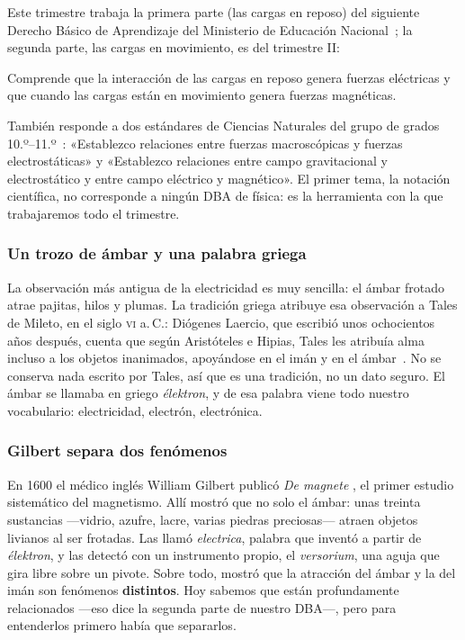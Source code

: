 \documentclass[11pt]{article}
\begin{document}
Este trimestre trabaja la primera parte (las cargas en reposo) del siguiente
Derecho Básico de Aprendizaje del Ministerio de Educación
Nacional~\cite{mendba}; la segunda parte, las cargas en movimiento, es del
trimestre II:

\begin{dba}
Comprende que la interacción de las cargas en reposo genera fuerzas eléctricas
y que cuando las cargas están en movimiento genera fuerzas magnéticas.
\end{dba}

También responde a dos estándares de Ciencias Naturales del grupo de grados
10.º--11.º~\cite{menestandares}: «Establezco relaciones entre fuerzas
macroscópicas y fuerzas electrostáticas» y «Establezco relaciones entre campo
gravitacional y electrostático y entre campo eléctrico y magnético». El primer
tema, la notación científica, no corresponde a ningún DBA de física: es la
herramienta con la que trabajaremos todo el trimestre.


\subsubsection*{Un trozo de ámbar y una palabra griega}

La observación más antigua de la electricidad es muy sencilla: el ámbar
frotado atrae pajitas, hilos y plumas. La tradición griega atribuye esa
observación a Tales de Mileto, en el siglo \textsc{vi} a.\,C.: Diógenes
Laercio, que escribió unos ochocientos años después, cuenta que según
Aristóteles e Hipias, Tales les atribuía alma incluso a los objetos
inanimados, apoyándose en el imán y en el ámbar~\cite{laercio}. No se conserva
nada escrito por Tales, así que es una tradición, no un dato seguro. El ámbar
se llamaba en griego \emph{élektron}, y de esa palabra viene todo nuestro
vocabulario: electricidad, electrón, electrónica.

\subsubsection*{Gilbert separa dos fenómenos}

En 1600 el médico inglés William Gilbert publicó \emph{De magnete}
\cite{gilbert1600}, el primer estudio sistemático del magnetismo. Allí mostró
que no solo el ámbar: unas treinta sustancias ---vidrio, azufre, lacre, varias
piedras preciosas--- atraen objetos livianos al ser frotadas. Las llamó
\emph{electrica}, palabra que inventó a partir de \emph{élektron}, y las
detectó con un instrumento propio, el \emph{versorium}, una aguja que gira
libre sobre un pivote. Sobre todo, mostró que la atracción del ámbar y la del
imán son fenómenos \textbf{distintos}. Hoy sabemos que están profundamente
relacionados ---eso dice la segunda parte de nuestro DBA---, pero para
entenderlos primero había que separarlos.
\end{document}
